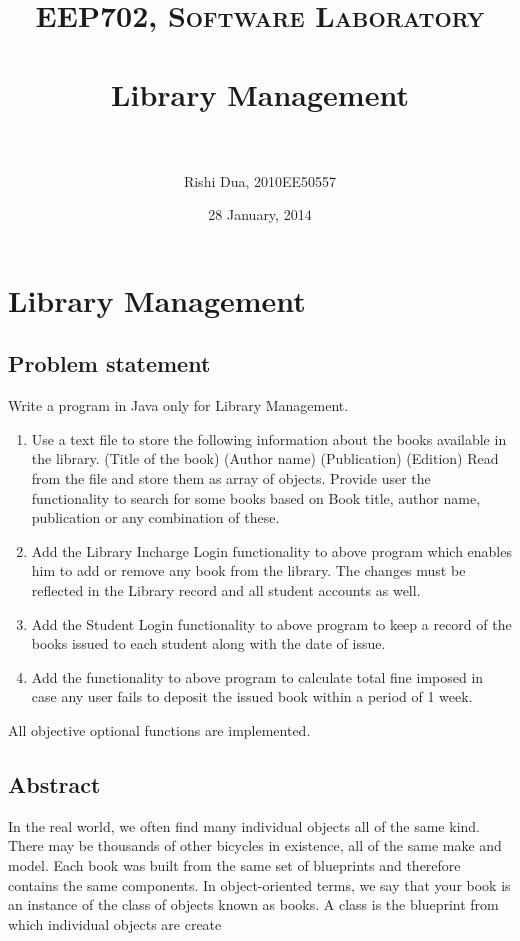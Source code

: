 \documentclass[paper=a4, fontsize=11pt]{scrartcl} %
\title{	
\normalfont \normalsize 
\textsc{EEP702, Software Laboratory} \\ [25pt] %
\horrule{0.5pt} \\[0.4cm] %
\huge Library Management \\ %
\horrule{2pt} \\[0.5cm] %
}
\author{Rishi Dua, 2010EE50557} %
\date{\normalsize 28 January, 2014} %
\numberwithin{equation}{section} %
\numberwithin{figure}{section} %
\numberwithin{table}{section} %
\begin{document}
\maketitle %


\section{Library Management}


\subsection{Problem statement}
Write a program in Java only for Library Management.
\begin{enumerate}
\item Use a text file to store the following information about the books available in the library.
(Title of the book) (Author name) (Publication) (Edition)
Read from the file and store them as array of objects. Provide user the functionality to 
search for some books based on Book title, author name, publication or any combination of 
these.
\item Add the Library Incharge Login functionality to above program which enables him to add 
or remove any book from the library. The changes must be reflected in the Library record 
and all student accounts as well.
\item Add the Student Login functionality to above program to keep a record of the books 
issued to each student along with the date of issue.
\item Add the functionality to above program to calculate total fine imposed in case any user 
fails to deposit the issued book within a period of 1 week.
\end{enumerate}

All objective optional functions are implemented.

\subsection{Abstract}

In the real world, we often find many individual objects all of the same kind. There may be thousands of other bicycles in existence, all of the same make and model. Each book was built from the same set of blueprints and therefore contains the same components. In object-oriented terms, we say that your book is an instance of the class of objects known as books. A class is the blueprint from which individual objects are create\\
\end{document}
